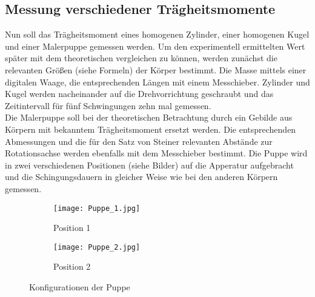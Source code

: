 \subsection{Messung verschiedener Trägheitsmomente}
Nun soll das Trägheitsmoment eines homogenen Zylinder, einer homogenen Kugel und einer
Malerpuppe gemessen werden. Um den experimentell ermittelten Wert später mit dem theoretischen
vergleichen zu können, werden zunächst die relevanten Größen (siehe Formeln) der Körper
bestimmt. Die Masse mittels einer digitalen Waage, die entsprechenden Längen mit einem
Messchieber. Zylinder und Kugel werden nacheinander auf die Drehvorrichtung geschraubt und
das Zeitintervall für fünf Schwingungen zehn mal gemessen. \\
Die Malerpuppe soll bei der theoretischen Betrachtung durch ein Gebilde aus Körpern mit
bekanntem Trägheitsmoment ersetzt werden. Die entsprechenden Abmessungen und die für den Satz
von Steiner relevanten Abstände zur Rotationsachse werden ebenfalls mit dem Messchieber bestimmt.
Die Puppe wird in zwei verschiedenen Positionen (siehe Bilder) auf die Apperatur aufgebracht
und die Schingungsdauern in gleicher Weise wie bei den anderen Körpern gemessen. \\

\begin{figure}
\centering
\begin{subfigure}{0.48\textwidth}
\centering
\texttt{[image: Puppe\_1.jpg]}
\caption{Position 1}
\label{fig:pup1}
\end{subfigure}
\begin{subfigure}{0.48\textwidth}
\centering
\texttt{[image: Puppe\_2.jpg]}
\caption{Position 2}
\label{fig:pup2}
\end{subfigure}
\caption{Konfigurationen der Puppe}
\label{fig:konfig}
\end{figure}
